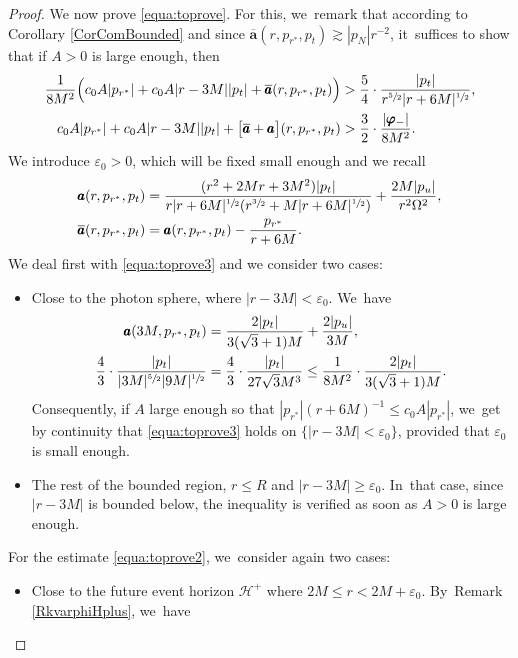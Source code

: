 \documentclass[JEP,XML,SOM,Unicode,published]{cedram}
\let\epsilon\varepsilon
\theoremstyle{plain}
\theoremstyle{definition}
\begin{document}
\begin{proof}
We now prove \eqref{equa:toprove}. For this, we~remark that according to Corollary \ref{CorComBounded} and since $\overline{\pmb{a}}(r,p_{r^*},p_t) \gtrsim |p_N|r^{-2}$, it~suffices to show that if $A>0$ is large enough, then
\begin{align}
\label{equa:toprove3}
\frac{1}{8M^2}\Bigl(c_0A |p_{r^*}|+c_0A|r-3M||p_t|+\overline{\pmb{a}}(r,p_{r^*},p_t) \Bigr) & > \frac{5}{4} \cdot \frac{|p_t|}{r^{\sfrac{5}{2}}|r+6M|^{\sfrac{1}{2}}}, \\
\label{equa:toprove2}
c_0A |p_{r^*}|+c_0A|r-3M||p_t|+ \bigl[\overline{\pmb{a}}+\pmb{a} \bigr](r,p_{r^*},p_t) & > \frac{3}{2} \cdot \frac{|\pmb{\varphi}_-|}{8M^2}.
\end{align}
We introduce $\epsilon_0>0$, which will be fixed small enough and we recall
\begin{align*}
\pmb{a}(r,p_{r^*},p_t) & = \frac{(r^2+2Mr+3M^2)|p_t|}{r|r+6M|^{\sfrac{1}{2}}(r^{\sfrac{3}{2}}+M|r+6M|^{\sfrac{1}{2}}) } +\frac{2M|p_u|}{r^2\Omega^2}, \\
\overline{\pmb{a}}(r,p_{r^*},p_t)& =\pmb{a}(r,p_{r^*},p_t)-\frac{p_{r^*}}{r+6M}.
\end{align*}
We deal first with \eqref{equa:toprove3} and we consider two cases:
\begin{itemize}
\item Close to the photon sphere, where $|r-3M| < \epsilon_0$. We~have
\begin{align*}
\pmb{a}(3M,p_{r^*},p_t) & = \frac{2|p_t|}{3(\sqrt{3}+1)M}+\frac{2|p_u|}{3M }, \\
\frac{4}{3} \cdot \frac{|p_t|}{|3M|^{\sfrac{5}{2}}|9M|^{\sfrac{1}{2}}} & = \frac{4}{3} \cdot \frac{|p_t|}{27 \sqrt{3} M^3} \leq \frac{1}{ 8M^2} \cdot \frac{2|p_t|}{3(\sqrt{3}+1)M}.
\end{align*}
Consequently, if $A$ large enough so that $|p_{r^*}|(r+6M)^{-1} \leq c_0A|p_{r^*}|$, we~get by continuity that \eqref{equa:toprove3} holds on $\{|r-3M|<\epsilon_0\}$, provided that $\epsilon_0$ is small enough.
\item The rest of the bounded region, $r \leq R$ and $|r-3M| \geq \epsilon_0$. In~that case, since $|r-3M|$ is bounded below, the inequality is verified as soon as $A>0$ is large enough.
\end{itemize}
For the estimate \eqref{equa:toprove2}, we~consider again two cases:
\begin{itemize}
\item Close to the future event horizon $\mathcal{H}^+$ where $2M \leq r < 2M+\epsilon_0$. By~Remark \ref{RkvarphiHplus}, we~have

\end{itemize}
\end{proof}
\end{document}
